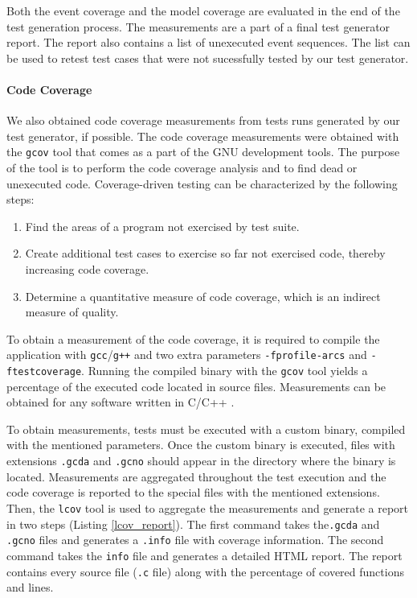 Both the event coverage and the model coverage are evaluated in the end of the test generation process. The measurements are a part of a final test generator report. The report also contains a list of unexecuted event sequences. The list can be used to retest test cases that were not sucessfully tested by our test generator.

\paragraph{Code Coverage} We also obtained code coverage measurements from tests runs generated by our test generator, if possible. The code coverage measurements were obtained with the \verb|gcov| tool that comes as a part of the GNU development tools. The purpose of the tool is to perform the code coverage analysis and to find dead or unexecuted code. Coverage-driven testing can be characterized by the following steps: 
\begin{enumerate}
  \item Find the areas of a program not exercised by test suite.
  \item Create additional test cases to exercise so far not exercised code, thereby increasing code coverage.
  \item Determine a quantitative measure of code coverage, which is an indirect measure of quality.
\end{enumerate}

To obtain a measurement of the code coverage, it is required to compile the application with \verb|gcc|/\verb|g++| and two extra parameters \verb|-fprofile-arcs| and \verb|-ftestcoverage|. Running the compiled binary with the \verb|gcov| tool yields a percentage of the executed code located in source files. Measurements can be obtained for any software written in C/C++ \cite{gcov}.

To obtain measurements, tests must be executed with a custom binary, compiled with the mentioned parameters. Once the custom binary is executed, files with extensions \texttt{.gcda} and \texttt{.gcno} should appear in the directory where the binary is located. Measurements are aggregated throughout the test execution and the code coverage is reported to the special files with the mentioned extensions. Then, the \texttt{lcov} tool is used to aggregate the measurements and generate a report in two steps (Listing \ref{lcov_report}). The first command takes the\texttt{.gcda} and \texttt{.gcno} files and generates a \texttt{.info} file with coverage information. The second command takes the \texttt{info} file and generates a detailed HTML report. The report contains every source file (\texttt{.c} file) along with the percentage of covered functions and lines.

